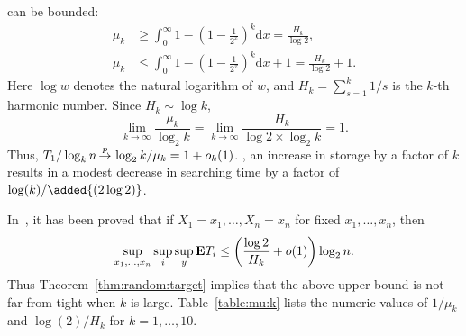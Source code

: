 \documentclass{article}
\newcommand{\e}{{\textbf E}}
\newcommand\inprobHIGH{\,{\buildrel p \over \rightarrow}\,}
\newcommand\inprob{{\inprobHIGH}}
\begin{document}
 can be bounded:
\begin{align*}
    \mu_k & \ge \int_{0}^\infty 1 - \left(1-\frac 1 {2^{x}}\right)^{k}
    \mathrm{d}x = \frac {H_k} {\log 2}, \\
    \mu_k & \le \int_{0}^\infty 1 - \left(1-\frac 1 {2^{x}}\right)^{k} \mathrm{d}x + 1 =
    \frac {H_k} {\log 2} + 1.
\end{align*}
Here $\log w$ denotes the natural logarithm of $w$, and $H_k = \sum_{s=1}^k
1/s$ is the $k$-th harmonic number. Since $H_k \sim \log k$,
$$
\lim_{k \to \infty} \frac {\mu_k} {\log_2 k} 
= \lim_{k \to \infty} \frac {H_k} {\log 2 \times \log_2 k} 
= 1.
$$
Thus, $T_1 /\log_k n \inprob \log_2 k / \mu_k = 1 + o_k(1)$. \added{Since \(T_1/(\frac 1 2 \log_2 n) \inprob
1\) when \(k=1\)}, an increase in
storage by a factor of $k$ results in a modest decrease in searching time by
a factor of $\log(k)/ \added{(2 \log 2)}$.

In~\citep{Cai2013}, it has been proved that if $X_1=x_1,\dots,X_n=x_n$ for fixed
$x_1,\ldots,x_n$, then
$$
\sup_{x_1,\ldots,x_n} \sup_{i} \sup_{y} \e{T_i} \le \left(\frac {\log 2}{H_k} +
o(1)\right)\log_2 n.
$$
Thus Theorem~\ref{thm:random:target} implies that the above upper bound is not
far from tight when $k$ is large. Table~\ref{table:mu:k} lists the numeric
values of $1/\mu_k$ and $\log(2)/H_k$ for $k = 1,\ldots,10$.

\begin{table}
    \label{table:mu:k}
    \setlength{\tabcolsep}{12pt}
    \caption{Numeric values of $1/\mu_k$ and $\log(2)/H_k$.}
\end{table}
\end{document}
